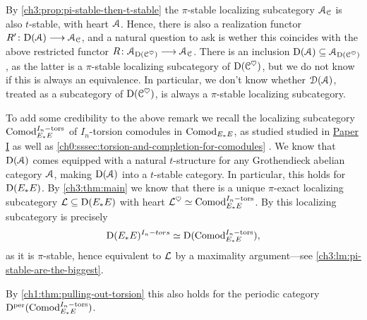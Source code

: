 \begin{remark}
    By \cref{ch3:prop:pi-stable-then-t-stable} the $\pi$-stable localizing subcategory $\EuScript{A}_{\EuScript{C}}$ is also $t$-stable, with heart $\EuScript{A}$. Hence, there is also a realization functor $R'\colon \mathrm{D}(\EuScript{A})\longrightarrow \EuScript{A}_{\EuScript{C}}$, and a natural question to ask is wether this coincides with the above restricted functor $R\colon \EuScript{A}_{\mathrm{D}(\EuScript{C}^\heartsuit)}\longrightarrow \EuScript{A}_{\EuScript{C}}$. There is an inclusion $\mathrm{D}(\EuScript{A})\subseteq \EuScript{A}_{\mathrm{D}(\EuScript{C}^\heartsuit)}$, as the latter is a $\pi$-stable localizing subcategory of $\mathrm{D}(\EuScript{C}^\heartsuit)$, but we do not know if this is always an equivalence. In particular, we don't know whether $\EuScript{D}(\EuScript{A})$, treated as a subcategory of $\mathrm{D}(\EuScript{C}^\heartsuit)$, is always a $\pi$-stable localizing subcategory. 
\end{remark}

\begin{addendum}
    To add some credibility to the above remark we recall 
    the localizing subcategory $\mathrm{Comod}_{E_*E}^{I_n-\mathrm{tors}}$ of $I_n$-torsion comodules in $\mathrm{Comod}_{E_*E}$, as studied studied in \hyperref[ch1]{Paper I} as well as \cref{ch0:sssec:torsion-and-completion-for-comodules} . We know that $\mathrm{D}(\EuScript{A})$ comes equipped with a natural $t$-structure for any Grothendieck abelian category $\EuScript{A}$, making $\mathrm{D}(\EuScript{A})$ into a $t$-stable category. In particular, this holds for $\mathrm{D}(E_*E)$. By \cref{ch3:thm:main} we know that there is a unique $\pi$-exact localizing subcategory $\mathcal{L} \subseteq \mathrm{D}(E_*E)$ with heart $\mathcal{L}^\heartsuit \simeq \mathrm{Comod}_{E_*E}^{I_n-\mathrm{tors}}$. By \cite[3.7(2)]{barthel-heard-valenzuela_2020} this localizing subcategory is precisely 
    \[\mathrm{D}(E_*E)^{I_n-tors} \simeq \mathrm{D}(\mathrm{Comod}_{E_*E}^{I_n-\mathrm{tors}}),\]
    as it is $\pi$-stable, hence equivalent to $\mathcal{L}$ by a maximality argument---see \cref{ch3:lm:pi-stable-are-the-biggest}. 

    By \cref{ch1:thm:pulling-out-torsion} this also holds for the periodic category $\mathrm{D}^{\mathrm{per}}(\mathrm{Comod}_{E_*E}^{I_n-\mathrm{tors}})$. 
\end{addendum}














